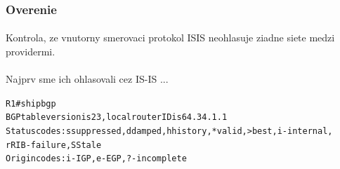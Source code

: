 \documentclass[12pt,twoside,a4paper]{report}
\begin{document}
\subsubsection{Overenie}
\paragraph{}
Kontrola, ze vnutorny smerovaci protokol ISIS neohlasuje ziadne siete medzi providermi.

\paragraph{}
Najprv sme ich ohlasovali cez IS-IS ...

\noindent
{\selectfont
\begin{small}
\begin{alltt}
R1#sh ip bgp              
BGP table version is 23, local router ID is 64.34.1.1
Status codes: s suppressed, d damped, h history, * valid, > best, i - internal,
              r RIB-failure, S Stale
Origin codes: i - IGP, e - EGP, ? - incomplete


\end{alltt}
\end{small}}
\end{document}
